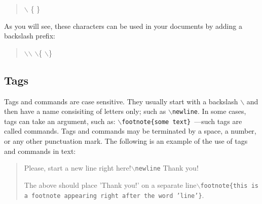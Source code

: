 \documentclass[11pt]{article}
\newcommand{\cmd}[1]{{\tt $\backslash$#1}}
\begin{document}
\begin{quote}
$\backslash$ \{ \}
\end{quote}

\noindent As you will see, these characters can be used in your documents
by adding a backslash prefix:

\begin{quote}
$\backslash$$\backslash$ $\backslash$\{ $\backslash$\}
\end{quote}









\subsection{Tags}

Tags and commands are case sensitive. They usually start with a
backslash $\backslash$ and then have a name consisiting of letters
only; such as \cmd{newline}. In some cases, tags can take an argument,
such as: \cmd{footnote\{some text\}}\ ---such tags are called
commands. Tags and commands may be terminated by a space, a number, or
any other punctuation mark. The following is an example of the use of
tags and commands in text:
\begin{quote}
Please, start a new line right here!\cmd{newline} Thank you!

The above should place 'Thank you!' on a separate line\cmd{footnote\{this
is a footnote appearing right after the word 'line'\}}.
\end{quote}
\end{document}
